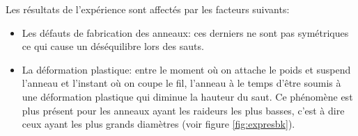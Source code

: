 Les résultats de l'expérience sont affectés par les facteurs suivants:

\begin{itemize}
    \item Les défauts de fabrication des anneaux: ces derniers ne sont pas symétriques ce qui cause un déséquilibre lors des sauts.
    \item La déformation plastique: entre le moment où on attache le poids et suspend l'anneau et l'instant où on coupe le fil, l'anneau à le temps d'être soumis à une déformation plastique qui diminue la hauteur du saut. Ce phénomène est plus présent pour les anneaux ayant les raideurs les plus basses, c'est à dire ceux ayant les plus grands diamètres (voir figure \ref{fig:expresbk}).
\end{itemize}